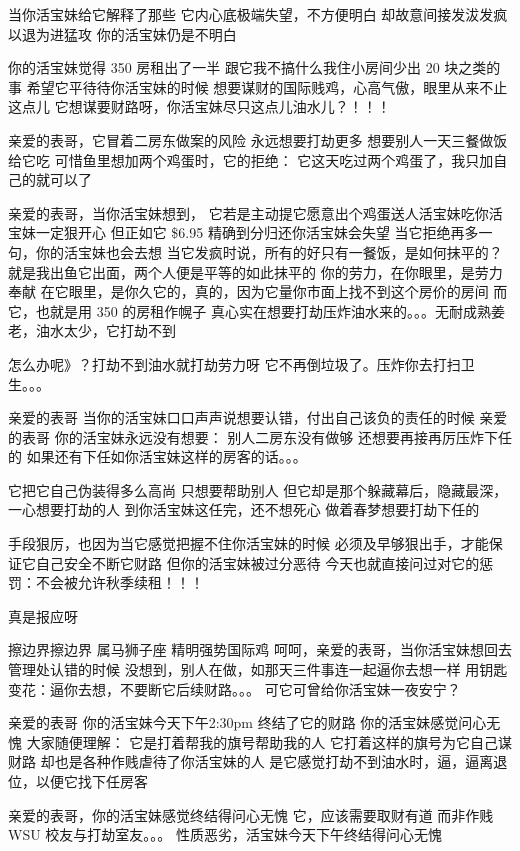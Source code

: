 \documentclass[9pt, b5paper]{article}
\begin{document}
当你活宝妹给它解释了那些
它内心底极端失望，不方便明白
却故意间接发沷发疯以退为进猛攻
你的活宝妹仍是不明白

你的活宝妹觉得 350 房租出了一半
跟它我不搞什么我住小房间少出 20 块之类的事
希望它平待待你活宝妹的时候
想要谋财的国际贱鸡，心高气傲，眼里从来不止这点儿
它想谋要财路呀，你活宝妹尽只这点儿油水儿？！！！

亲爱的表哥，它冒着二房东做案的风险
永远想要打劫更多
想要别人一天三餐做饭给它吃
可惜鱼里想加两个鸡蛋时，它的拒绝：
它这天吃过两个鸡蛋了，我只加自己的就可以了

亲爱的表哥，当你活宝妹想到，
它若是主动提它愿意出个鸡蛋送人活宝妹吃你活宝妹一定狠开心
但正如它 \$6.95 精确到分归还你活宝妹会失望
当它拒绝再多一句，你的活宝妹也会去想
当它发疯时说，所有的好只有一餐饭，是如何抹平的？
就是我出鱼它出面，两个人便是平等的如此抹平的
你的劳力，在你眼里，是劳力奉献
在它眼里，是你久它的，真的，因为它量你市面上找不到这个房价的房间
而它，也就是用 350 的房租作幌子
真心实在想要打劫压炸油水来的。。。无耐成熟姜老，油水太少，它打劫不到

怎么办呢》？打劫不到油水就打劫劳力呀
它不再倒垃圾了。压炸你去打扫卫生。。。

亲爱的表哥
当你的活宝妹口口声声说想要认错，付出自己该负的责任的时候
亲爱的表哥
你的活宝妹永远没有想要：
别人二房东没有做够
还想要再接再厉压炸下任的
如果还有下任如你活宝妹这样的房客的话。。。

它把它自己伪装得多么高尚
只想要帮助别人
但它却是那个躲藏幕后，隐藏最深，一心想要打劫的人
到你活宝妹这任完，还不想死心
做着春梦想要打劫下任的

手段狠厉，也因为当它感觉把握不住你活宝妹的时候
必须及早够狠出手，才能保证它自己安全不断它财路
但你的活宝妹被过分恶待
今天也就直接问过对它的惩罚：不会被允许秋季续租！！！

真是报应呀

擦边界擦边界
属马狮子座
精明强势国际鸡
呵呵，亲爱的表哥，当你活宝妹想回去管理处认错的时候
没想到，别人在做，如那天三件事连一起逼你去想一样
用钥匙变花：逼你去想，不要断它后续财路。。。
可它可曾给你活宝妹一夜安宁？

亲爱的表哥
你的活宝妹今天下午2:30pm 终结了它的财路
你的活宝妹感觉问心无愧
大家随便理解：
它是打着帮我的旗号帮助我的人
它打着这样的旗号为它自己谋财路
却也是各种作贱虐待了你活宝妹的人
是它感觉打劫不到油水时，逼，逼离退位，以便它找下任房客

亲爱的表哥，你的活宝妹感觉终结得问心无愧
它，应该需要取财有道
而非作贱WSU 校友与打劫室友。。。
性质恶劣，活宝妹今天下午终结得问心无愧
\end{document}
